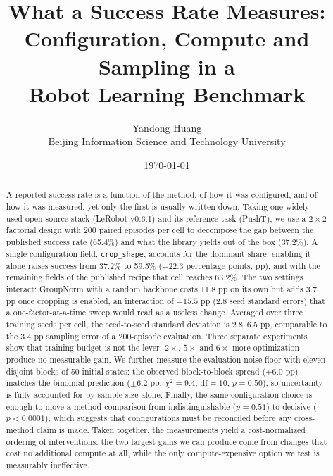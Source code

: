 \documentclass[11pt]{article}
\title{What a Success Rate Measures:\\
Configuration, Compute and Sampling in a\\
Robot Learning Benchmark}
\author{Yandong Huang\\
\small Beijing Information Science and Technology University}
\date{\today}
\begin{document}
\maketitle

\begin{abstract}
A reported success rate is a function of the method, of how it was configured,
and of how it was measured, yet only the first is usually written down. Taking
one widely used open-source stack (LeRobot v0.6.1) and its reference task
(PushT), we use a $2\times2$ factorial design with 200 paired episodes per cell to
decompose the gap between the published success rate (65.4\%) and what the library
yields out of the box (37.2\%). A single configuration field, \texttt{crop\_shape},
accounts for the dominant share: enabling it alone raises success from 37.2\% to
59.5\% ($+22.3$ percentage points, pp), and with the remaining fields of the
published recipe that cell reaches 63.2\%. The two settings interact: GroupNorm
with a random backbone costs 11.8 pp on its own but adds 3.7 pp once cropping is
enabled, an interaction of $+15.5$ pp (2.8 seed standard errors) that a
one-factor-at-a-time sweep would read as a useless change. Averaged over three
training seeds per cell, the seed-to-seed standard deviation is 2.8--6.5 pp,
comparable to the 3.4 pp sampling error of a 200-episode evaluation. Three separate experiments show that training
budget is not the lever: $2\times$, $5\times$ and $6\times$ more optimization
produce no measurable gain. We further measure the evaluation noise floor with
eleven disjoint blocks of 50 initial states: the observed block-to-block spread
($\pm6.0$ pp) matches the binomial prediction ($\pm6.2$ pp; $\chi^2=9.4$, df$=10$,
$p=0.50$), so uncertainty is fully accounted for by sample size alone. Finally, the
same configuration choice is enough to move a method comparison from
indistinguishable ($p=0.51$) to decisive ($p<0.0001$), which suggests that
configurations must be reconciled before any cross-method claim is made.
Taken together, the measurements yield a cost-normalized ordering of
interventions: the two largest gains we can produce come from changes that cost no
additional compute at all, while the only compute-expensive option we test is
measurably ineffective.
\end{abstract}
\end{document}
